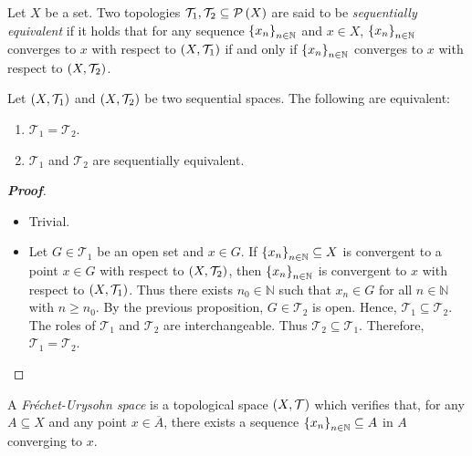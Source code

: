 \begin{definition}
  \rm Let $X$ be a set. Two topologies $\mathcal{T}_1,\mathcal{T}_2\subseteq\mathcal{P}\left(X\right)$ are said to be \textit{sequentially equivalent} if it holds that for any sequence $\left\{x_n\right\}_{n\in\mathbb{N}}$ and $x\in X$, $\left\{x_n\right\}_{n\in\mathbb{N}}$ converges to $x$ with respect to $\left(X,\mathcal{T}_1\right)$ if and only if $\left\{x_n\right\}_{n\in\mathbb{N}}$ converges to $x$ with respect to $\left(X,\mathcal{T}_2\right)$.
\end{definition}

\begin{proposition}
  Let $\left(X,\mathcal{T}_1\right)$ and $\left(X,\mathcal{T}_2\right)$ be two sequential spaces. The following are equivalent:
  
  \begin{enumerate}
    \item $\mathcal{T}_1=\mathcal{T}_2$.
    \item $\mathcal{T}_1$ and $\mathcal{T}_2$ are sequentially equivalent.
  \end{enumerate}

  \begin{proof}[\rm\textbf{Proof}]
    \hfill
    \begin{itemize}
      \item[\boxed{1\Rightarrow2}] Trivial.
      \item[\boxed{2\Rightarrow1}] Let $G\in\mathcal{T}_1$ be an open set and $x\in G$. If $\left\{x_n\right\}_{n\in\mathbb{N}}\subseteq X$ is convergent to a point $x\in G$ with respect to $\left(X,\mathcal{T}_2\right)$, then $\left\{x_n\right\}_{n\in\mathbb{N}}$ is convergent to $x$ with respect to $\left(X,\mathcal{T}_1\right)$. Thus there exists $n_0\in\mathbb{N}$ such that $x_n\in G$ for all $n\in\mathbb{N}$ with $n\geq n_0$. By the previous proposition, $G\in\mathcal{T}_2$ is open. Hence, $\mathcal{T}_1\subseteq\mathcal{T}_2$. The roles of $\mathcal{T}_1$ and $\mathcal{T}_2$ are interchangeable. Thus $\mathcal{T}_2\subseteq\mathcal{T}_1$. Therefore, $\mathcal{T}_1=\mathcal{T}_2$.
    \end{itemize}
  \end{proof}
\end{proposition}

\begin{definition}
  A \textit{Fréchet-Urysohn space} is a topological space $\left(X,\mathcal{T}\right)$ which verifies that, for any $A\subseteq X$ and any point $x\in\overline{A}$, there exists a sequence $\left\{x_n\right\}_{n\in\mathbb{N}}\subseteq A$ in $A$ converging to $x$.
\end{definition}

